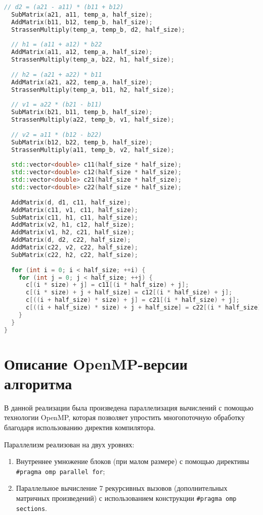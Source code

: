 \documentclass[14pt,a4paper]{extarticle}
\begin{document}
\begin{lstlisting}[language=C++]
  // d2 = (a21 - a11) * (b11 + b12)
  SubMatrix(a21, a11, temp_a, half_size);
  AddMatrix(b11, b12, temp_b, half_size);
  StrassenMultiply(temp_a, temp_b, d2, half_size);
  
  // h1 = (a11 + a12) * b22
  AddMatrix(a11, a12, temp_a, half_size);
  StrassenMultiply(temp_a, b22, h1, half_size);
  
  // h2 = (a21 + a22) * b11
  AddMatrix(a21, a22, temp_a, half_size);
  StrassenMultiply(temp_a, b11, h2, half_size);
  
  // v1 = a22 * (b21 - b11)
  SubMatrix(b21, b11, temp_b, half_size);
  StrassenMultiply(a22, temp_b, v1, half_size);
  
  // v2 = a11 * (b12 - b22)
  SubMatrix(b12, b22, temp_b, half_size);
  StrassenMultiply(a11, temp_b, v2, half_size);
  
  std::vector<double> c11(half_size * half_size);
  std::vector<double> c12(half_size * half_size);
  std::vector<double> c21(half_size * half_size);
  std::vector<double> c22(half_size * half_size);
  
  AddMatrix(d, d1, c11, half_size);
  AddMatrix(c11, v1, c11, half_size);
  SubMatrix(c11, h1, c11, half_size);
  AddMatrix(v2, h1, c12, half_size);
  AddMatrix(v1, h2, c21, half_size);
  AddMatrix(d, d2, c22, half_size);
  AddMatrix(c22, v2, c22, half_size);
  SubMatrix(c22, h2, c22, half_size);
   
  for (int i = 0; i < half_size; ++i) {
    for (int j = 0; j < half_size; ++j) {
      c[(i * size) + j] = c11[(i * half_size) + j];
      c[(i * size) + j + half_size] = c12[(i * half_size) + j];
      c[((i + half_size) * size) + j] = c21[(i * half_size) + j];
      c[((i + half_size) * size) + j + half_size] = c22[(i * half_size) + j];
    }
  }
}
\end{lstlisting}

\newpage

\section{Описание OpenMP-версии алгоритма}

В данной реализации была произведена параллелизация вычислений с помощью технологии OpenMP, которая позволяет упростить многопоточную обработку благодаря использованию директив компилятора.

Параллелизм реализован на двух уровнях:
\begin{enumerate}
    \item Внутреннее умножение блоков (при малом размере) с помощью директивы \texttt{\#pragma omp parallel for};
    \item Параллельное вычисление 7 рекурсивных вызовов (дополнительных матричных произведений) с использованием конструкции \texttt{\#pragma omp sections}.
\end{enumerate}
\end{document}

